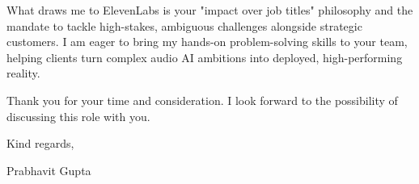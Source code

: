 \documentclass[11pt,a4paper]{article}
\begin{document}
\noindent What draws me to ElevenLabs is your "impact over job titles" philosophy and the mandate to tackle high-stakes, ambiguous challenges alongside strategic customers. I am eager to bring my hands-on problem-solving skills to your team, helping clients turn complex audio AI ambitions into deployed, high-performing reality.

\vspace{10pt}

\noindent Thank you for your time and consideration. I look forward to the possibility of discussing this role with you.

\vspace{20pt}

\noindent Kind regards,

\vspace{10pt}

\noindent Prabhavit Gupta
\end{document}
